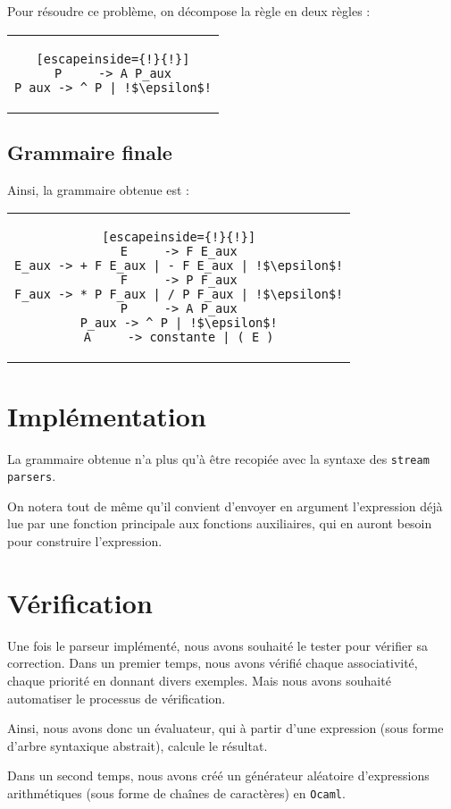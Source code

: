 \documentclass[11pt]{article}
\begin{document}
Pour résoudre ce problème, on décompose la règle en deux règles :
\begin{center}
\begin{tabular}{c}
\begin{lstlisting}[escapeinside={!}{!}]
P     -> A P_aux
P_aux -> ^ P | !$\epsilon$!
\end{lstlisting}
\end{tabular}
\end{center}

\subsection{Grammaire finale}
Ainsi, la grammaire obtenue est :
\begin{center}
\begin{tabular}{c}
\begin{lstlisting}[escapeinside={!}{!}]
E     -> F E_aux
E_aux -> + F E_aux | - F E_aux | !$\epsilon$!
F     -> P F_aux
F_aux -> * P F_aux | / P F_aux | !$\epsilon$!
P     -> A P_aux
P_aux -> ^ P | !$\epsilon$!
A     -> constante | ( E )
\end{lstlisting}
\end{tabular}
\end{center}
 

\section{Implémentation}
La grammaire obtenue n'a plus qu'à être recopiée avec la syntaxe des \texttt{stream parsers}. 

On notera tout de même qu'il convient d'envoyer en argument l'expression déjà lue par une fonction principale aux fonctions auxiliaires, qui en auront besoin pour construire l'expression. 

\section{Vérification}
Une fois le parseur implémenté, nous avons souhaité le tester pour vérifier sa correction.
Dans un premier temps, nous avons vérifié chaque associativité, chaque priorité en donnant divers exemples. Mais nous avons souhaité automatiser le processus de vérification.


Ainsi, nous avons donc un évaluateur, qui à partir d'une expression (sous forme d'arbre syntaxique abstrait), calcule le résultat.

Dans un second temps, nous avons créé un générateur aléatoire d'expressions arithmétiques (sous forme de chaînes de caractères) en \texttt{Ocaml}.
\end{document}
